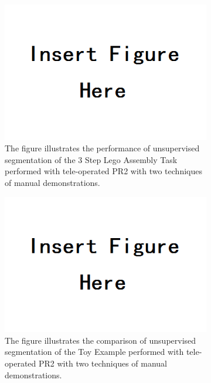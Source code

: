 \begin{figure}[ht!]
	\centering
	\begin{subfigure}[t]{3.4in}
	    \centering
        \includegraphics[width=0.5\linewidth]{figures/insert}
		\caption{The figure illustrates the performance of unsupervised segmentation of the 3 Step Lego Assembly Task performed with tele-operated PR2 with two techniques of manual demonstrations.}
		\vspace{-5pt}
	\end{subfigure}
	 \hspace{0.1in}
	\begin{subfigure}[t]{3.4in}
	    \centering
		\includegraphics[width=0.5\linewidth]{figures/insert}
		\caption{The figure illustrates the comparison of unsupervised segmentation of the Toy Example performed with tele-operated PR2 with two techniques of manual demonstrations.}
		\vspace{-5pt}
	\end{subfigure}
	\caption{}
	\vspace{-15pt}
\end{figure}


